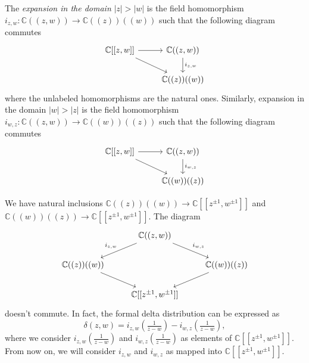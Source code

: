\documentclass[a4paper, 12pt, reqno]{amsart}
\theoremstyle{remark}
\numberwithin{equation}{subsection}
\begin{document}
The \emph{expansion in the domain} $|z| > |w|$ is the field homomorphism $i_{z, w}: \mathbb{C}((z, w)) \to \mathbb{C}((z))((w))$ such that the following diagram commutes
\begin{equation*}
  \begin{tikzcd}
    {\mathbb{C}[[z, w]]} \arrow[rd] \arrow[r] & {\mathbb{C}((z, w))} \arrow[d, "{i_{z,w}}"] \\
    & \mathbb{C}((z))((w))                                          
  \end{tikzcd}
\end{equation*}
where the unlabeled homomorphisms are the natural ones.
Similarly, expansion in the domain $|w| > |z|$ is the field homomorphism $i_{w, z}: \mathbb{C}((z, w)) \to \mathbb{C}((w))((z))$ such that the following diagram commutes
\begin{equation*}
  \begin{tikzcd}
    {\mathbb{C}[[z, w]]} \arrow[rd] \arrow[r] & {\mathbb{C}((z, w))}\arrow[d, "{i_{w, z}}"] \\
    & \mathbb{C}((w))((z))                                          
  \end{tikzcd}
\end{equation*}

We have natural inclusions $\mathbb{C}((z))((w)) \to \mathbb{C}[[z^{\pm 1}, w^{\pm 1}]]$ and $\mathbb{C}((w))((z)) \to \mathbb{C}[[z^{\pm 1}, w^{\pm 1}]]$.
The diagram
\begin{equation*}
  \begin{tikzcd}
    & {\mathbb{C}((z, w))} \arrow[ld, "{i_{z,w}}"'] \arrow[rd, "{i_{w,z}}"] &                                 \\
    \mathbb{C}((z))((w)) \arrow[rd] &                                                                      & \mathbb{C}((w))((z)) \arrow[ld] \\
    & {\mathbb{C}[[z^{\pm 1}, w^{\pm 1}]]}                                  &                                
  \end{tikzcd}
\end{equation*}
doesn't commute. In fact, the formal delta distribution can be expressed as
\begin{equation*} 
  \delta(z, w) = i_{z, w}(\tfrac{1}{z - w}) - i_{w, z}(\tfrac{1}{z - w}),
\end{equation*}
where we consider $i_{z, w}(\frac{1}{z - w})$ and $i_{w, z}(\frac{1}{z - w})$ as elements of $\mathbb{C}[[z^{\pm 1}, w^{\pm 1}]]$.
From now on, we will consider $i_{z, w}$ and $i_{w, z}$ as mapped into $\mathbb{C}[[z^{\pm 1}, w^{\pm 1}]]$.
\end{document}
